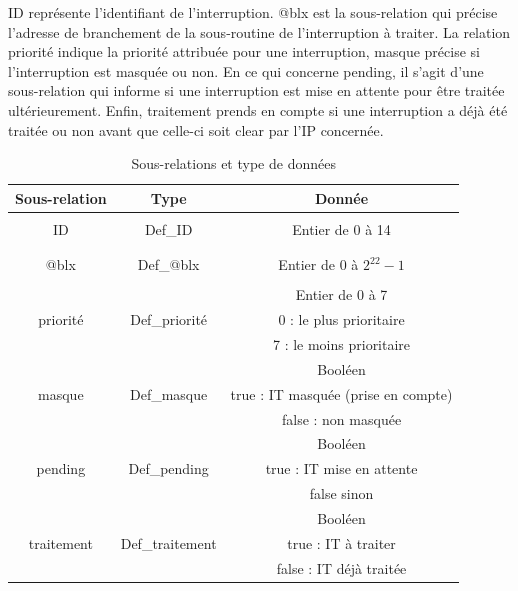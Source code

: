 ID représente l'identifiant de l'interruption.
@blx est la sous-relation qui précise l'adresse de branchement de la sous-routine de l'interruption à traiter.
La relation priorité indique la priorité attribuée pour une interruption, masque précise si l'interruption est masquée ou non.
En ce qui concerne pending, il s'agit d'une sous-relation qui informe si une interruption est mise en attente pour être traitée ultérieurement.
Enfin, traitement prends en compte si une interruption a déjà été traitée ou non avant que celle-ci soit clear par l'IP concernée.

\begin{table}[H]
	\centering
	\begin{tabular}{|c|c|c|}
		\hline
		Sous-relation & Type            & Donnée                              \\
		\hline
		& & \\
		ID & Def\_ID & Entier de 0 à 14\\
		& & \\
		\hline
		& & \\
		@blx & Def\_@blx & Entier de 0 à $2^{22}-1$\\
		& & \\
		\hline
		& & Entier de 0 à 7\\
		priorité & Def\_priorité & 0 : le plus prioritaire\\
		& & 7 : le moins prioritaire\\
		\hline
		              &                 & Booléen                             \\
		masque        & Def\_masque     & true : IT masquée (prise en compte) \\
		              &                 & false : non masquée                 \\
		\hline
		              &                 & Booléen                             \\
		pending       & Def\_pending    & true : IT mise en attente           \\
		              &                 & false sinon                         \\
		\hline
		              &                 & Booléen                             \\
		traitement    & Def\_traitement & true : IT à traiter                 \\
		              &                 & false : IT déjà traitée             \\
		\hline
	\end{tabular}
	\caption{Sous-relations et type de données}
	\label{tab:sous-relation}
\end{table}


